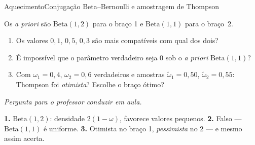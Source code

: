 \documentclass[aspectratio=169, 11pt]{beamer}
\newcommand{\paradiscussao}{\smallskip
  {\footnotesize\color{rlCinza}\itshape Pergunta para o professor conduzir em aula.}}
\newcommand{\Bet}{\mathrm{Beta}}
\begin{document}
\begin{frame}{Aquecimento}{Conjugação Beta--Bernoulli e amostragem de Thompson}
  \begin{quizbox}{}
    Os \textit{a priori} são $\Bet(1,2)$ para o braço 1 e $\Bet(1,1)$ para o braço~2.
    \begin{enumerate}
      \item Os valores $0{,}1$, $0{,}5$, $0{,}3$ são mais compatíveis com qual dos dois?
      \item É impossível que o parâmetro verdadeiro seja $0$ sob o \textit{a priori} $\Bet(1,1)$?
      \item Com $\omega_1 = 0{,}4$, $\omega_2 = 0{,}6$ verdadeiros e amostras
            $\tilde\omega_1 = 0{,}50$, $\tilde\omega_2 = 0{,}55$: Thompson foi
            \emph{otimista}? Escolhe o braço ótimo?
    \end{enumerate}
    \paradiscussao
  \end{quizbox}
  \pause
  \begin{respbox}
    \textbf{1.} $\Bet(1,2)$: densidade $2(1-\omega)$, favorece valores pequenos.\quad
    \textbf{2.} Falso --- $\Bet(1,1)$ é uniforme.\quad
    \textbf{3.} Otimista no braço 1, \emph{pessimista} no 2 --- e mesmo assim acerta.
  \end{respbox}
\end{frame}
\end{document}
